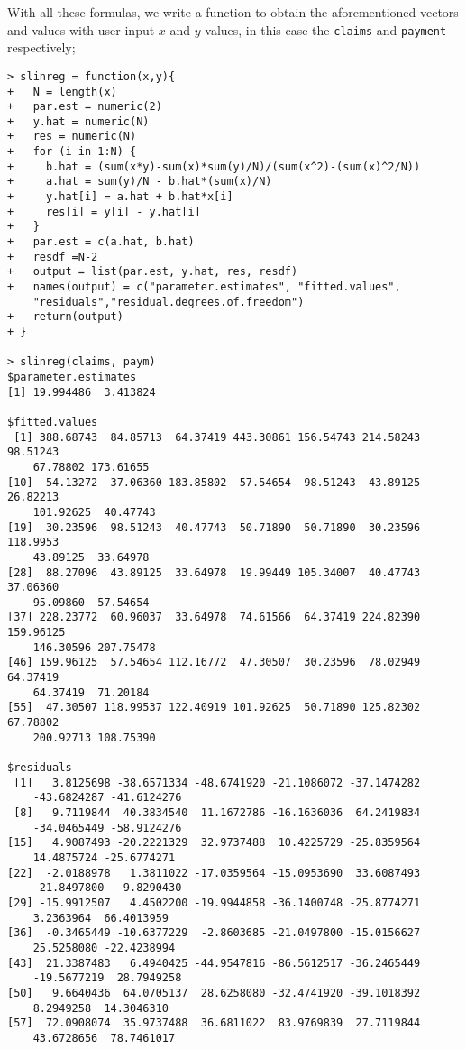 \documentclass[11pt,a4]{article}
\begin{document}
\begin{itemize}
With all these formulas, we write a function to obtain the aforementioned vectors and values with user input $x$ and $y$ values, in this case the \verb|claims| and \verb|payment| respectively;

\begin{verbatim}
> slinreg = function(x,y){
+   N = length(x)
+   par.est = numeric(2)
+   y.hat = numeric(N)
+   res = numeric(N)
+   for (i in 1:N) {
+     b.hat = (sum(x*y)-sum(x)*sum(y)/N)/(sum(x^2)-(sum(x)^2/N))
+     a.hat = sum(y)/N - b.hat*(sum(x)/N)
+     y.hat[i] = a.hat + b.hat*x[i]
+     res[i] = y[i] - y.hat[i]
+   }
+   par.est = c(a.hat, b.hat)
+   resdf =N-2
+   output = list(par.est, y.hat, res, resdf)
+   names(output) = c("parameter.estimates", "fitted.values",
    "residuals","residual.degrees.of.freedom")
+   return(output)
+ }

> slinreg(claims, paym)
$parameter.estimates
[1] 19.994486  3.413824

$fitted.values
 [1] 388.68743  84.85713  64.37419 443.30861 156.54743 214.58243  98.51243
    67.78802 173.61655
[10]  54.13272  37.06360 183.85802  57.54654  98.51243  43.89125  26.82213
    101.92625  40.47743
[19]  30.23596  98.51243  40.47743  50.71890  50.71890  30.23596 118.9953
    43.89125  33.64978
[28]  88.27096  43.89125  33.64978  19.99449 105.34007  40.47743  37.06360
    95.09860  57.54654
[37] 228.23772  60.96037  33.64978  74.61566  64.37419 224.82390 159.96125
    146.30596 207.75478
[46] 159.96125  57.54654 112.16772  47.30507  30.23596  78.02949  64.37419
    64.37419  71.20184
[55]  47.30507 118.99537 122.40919 101.92625  50.71890 125.82302  67.78802
    200.92713 108.75390

$residuals
 [1]   3.8125698 -38.6571334 -48.6741920 -21.1086072 -37.1474282
    -43.6824287 -41.6124276
 [8]   9.7119844  40.3834540  11.1672786 -16.1636036  64.2419834
    -34.0465449 -58.9124276
[15]   4.9087493 -20.2221329  32.9737488  10.4225729 -25.8359564
    14.4875724 -25.6774271
[22]  -2.0188978   1.3811022 -17.0359564 -15.0953690  33.6087493
    -21.8497800   9.8290430
[29] -15.9912507   4.4502200 -19.9944858 -36.1400748 -25.8774271
    3.2363964  66.4013959
[36]  -0.3465449 -10.6377229  -2.8603685 -21.0497800 -15.0156627
    25.5258080 -22.4238994
[43]  21.3387483   6.4940425 -44.9547816 -86.5612517 -36.2465449
    -19.5677219  28.7949258
[50]   9.6640436  64.0705137  28.6258080 -32.4741920 -39.1018392
    8.2949258  14.3046310
[57]  72.0908074  35.9737488  36.6811022  83.9769839  27.7119844
    43.6728656  78.7461017


\end{verbatim}
\end{itemize}
\end{document}
